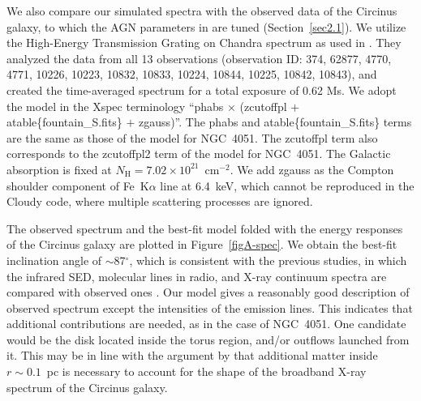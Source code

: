 \documentclass[twocolumn,times,twocolappendix]{aastex63}
\begin{document}
We also compare our simulated spectra with the observed data of the
Circinus galaxy, to which the AGN parameters in \citet{Wada2016} are tuned (Section~\ref{sec2.1}).
We utilize the High-Energy Transmission Grating
\citep[HETG:][]{Canizares2005} on Chandra \citep{Weisskopf2002} spectrum as used in
\citet{Uematsu2021}. They analyzed the data from all 13 observations
(observation ID: 374, 62877, 4770, 4771, 10226, 10223, 10832, 10833,
10224, 10844, 10225, 10842, 10843), and created the time-averaged
spectrum for a total exposure of 0.62 Ms. We adopt the model in the
Xspec terminology ``\textsf{phabs} $\times$ 
(\textsf{zcutoffpl} $+$ \textsf{atable\{fountain\_S.fits\}} $+$ \textsf{zgauss})''. The
\textsf{phabs} and \textsf{atable\{fountain\_S.fits\}} terms are the same as those of the
model for NGC~4051. 
The \textsf{zcutoffpl} term also corresponds to the \textsf{zcutoffpl2} term of the
model for NGC~4051. 
The Galactic absorption is fixed at $N_\mathrm{H} = 7.02
\times 10^{21}$~cm$^{-2}$. We add \textsf{zgauss} as the Compton
shoulder component of Fe~K$\alpha$ line at 6.4~keV, which cannot
be reproduced in the \textsf{Cloudy} code, where multiple scattering
processes are ignored.

The observed spectrum and the best-fit model folded with the energy
responses of the Circinus galaxy are plotted in
Figure~\ref{figA-spec}.  We obtain the best-fit inclination angle of
$\sim$87$^\circ$, which is consistent with the previous 
studies, in which the infrared SED, molecular lines in radio, and X-ray continuum spectra are compared with observed ones
\citep{Wada2016,Izumi2018,Uzuo2021,Buchner2021}.  Our model gives a reasonably good
description of observed spectrum except the intensities of the emission
lines. This indicates that additional contributions are needed, as in
the case of NGC~4051. One candidate would be the disk located inside
the torus region, and/or outflows launched from it. This may be in
line with the argument by \citet{Buchner2021} that additional matter inside
$r \sim 0.1$~pc is necessary to account for the shape of the broadband X-ray
spectrum of the Circinus galaxy.







\end{document}
